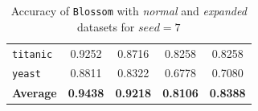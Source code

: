 \documentclass[12pt]{report}
\theoremstyle{definition}
\theoremstyle{definition}
\theoremstyle{definition}
\begin{document}
\begin{table}[ht]
\begin{tabular}{lcccc}
    \multicolumn{1}{l}{\tt titanic}       & \multicolumn{1}{c}{0.9252} & \multicolumn{1}{c}{0.8716} & \multicolumn{1}{c}{0.8258} & \multicolumn{1}{c}{0.8258} \\
    \multicolumn{1}{l}{\tt yeast}         & \multicolumn{1}{c}{0.8811} & \multicolumn{1}{c}{0.8322} & \multicolumn{1}{c}{0.6778} & \multicolumn{1}{c}{0.7080} \\
    \hline
    \multicolumn{1}{l}{\bf Average}       & \multicolumn{1}{c}{\bf 0.9438} & \multicolumn{1}{c}{\bf 0.9218} & \multicolumn{1}{c}{\bf 0.8106} & \multicolumn{1}{c}{\bf 0.8388} \\
    \hline
    \end{tabular}
    \caption{Accuracy of \texttt{Blossom} with \textit{normal} and \textit{expanded} datasets for $seed=7$}
    \label{fig:seed7}
\end{table}
\end{document}
